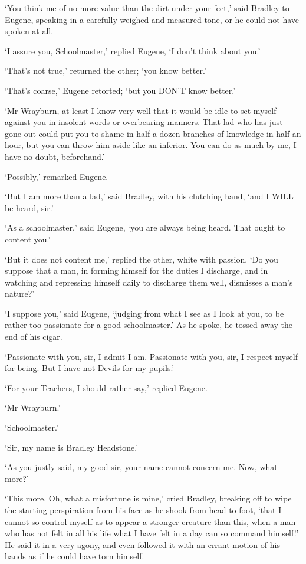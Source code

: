 ‘You think me of no more value than the dirt under your feet,’ said
Bradley to Eugene, speaking in a carefully weighed and measured tone, or
he could not have spoken at all.

‘I assure you, Schoolmaster,’ replied Eugene, ‘I don’t think about you.’

‘That’s not true,’ returned the other; ‘you know better.’

‘That’s coarse,’ Eugene retorted; ‘but you DON’T know better.’

‘Mr Wrayburn, at least I know very well that it would be idle to set
myself against you in insolent words or overbearing manners. That lad
who has just gone out could put you to shame in half-a-dozen branches of
knowledge in half an hour, but you can throw him aside like an inferior.
You can do as much by me, I have no doubt, beforehand.’

‘Possibly,’ remarked Eugene.

‘But I am more than a lad,’ said Bradley, with his clutching hand, ‘and
I WILL be heard, sir.’

‘As a schoolmaster,’ said Eugene, ‘you are always being heard. That
ought to content you.’

‘But it does not content me,’ replied the other, white with passion. ‘Do
you suppose that a man, in forming himself for the duties I discharge,
and in watching and repressing himself daily to discharge them well,
dismisses a man’s nature?’

‘I suppose you,’ said Eugene, ‘judging from what I see as I look at you,
to be rather too passionate for a good schoolmaster.’ As he spoke, he
tossed away the end of his cigar.

‘Passionate with you, sir, I admit I am. Passionate with you, sir, I
respect myself for being. But I have not Devils for my pupils.’

‘For your Teachers, I should rather say,’ replied Eugene.

‘Mr Wrayburn.’

‘Schoolmaster.’

‘Sir, my name is Bradley Headstone.’

‘As you justly said, my good sir, your name cannot concern me. Now, what
more?’

‘This more. Oh, what a misfortune is mine,’ cried Bradley, breaking off
to wipe the starting perspiration from his face as he shook from head to
foot, ‘that I cannot so control myself as to appear a stronger creature
than this, when a man who has not felt in all his life what I have felt
in a day can so command himself!’ He said it in a very agony, and even
followed it with an errant motion of his hands as if he could have torn
himself.

